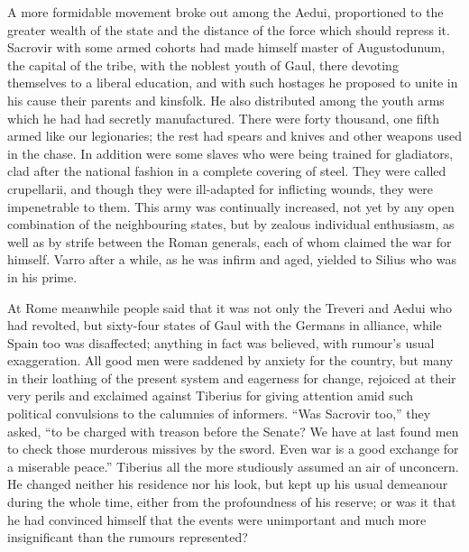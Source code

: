 
A more formidable movement broke out among the Aedui, proportioned to the greater wealth of the state and the distance of the force which should repress it. Sacrovir with some armed cohorts had made himself master of Augustodunum, the capital of the tribe, with the noblest youth of Gaul, there devoting themselves to a liberal education, and with such hostages he proposed to unite in his cause their parents and kinsfolk. He also distributed among the youth arms which he had had secretly manufactured. There were forty thousand, one fifth armed like our legionaries; the rest had spears and knives and other weapons used in the chase. In addition were some slaves who were being trained for gladiators, clad after the national fashion in a complete covering of steel. They were called crupellarii, and though they were ill-adapted for inflicting wounds, they were impenetrable to them. This army was continually increased, not yet by any open combination of the neighbouring states, but by zealous individual enthusiasm, as well as by strife between the Roman generals, each of whom claimed the war for himself. Varro after a while, as he was infirm and aged, yielded to Silius who was in his prime.


At Rome meanwhile people said that it was not only the Treveri and Aedui who had revolted, but sixty-four states of Gaul with the Germans in alliance, while Spain too was disaffected; anything in fact was believed, with rumour's usual exaggeration. All good men were saddened by anxiety for the country, but many in their loathing of the present system and eagerness for change, rejoiced at their very perils and exclaimed against Tiberius for giving attention amid such political convulsions to the calumnies of informers. ``Was Sacrovir too,'' they asked, ``to be charged with treason before the Senate? We have at last found men to check those murderous missives by the sword. Even war is a good exchange for a miserable peace.'' Tiberius all the more studiously assumed an air of unconcern. He changed neither his residence nor his look, but kept up his usual demeanour during the whole time, either from the profoundness of his reserve; or was it that he had convinced himself that the events were unimportant and much more insignificant than the rumours represented?


